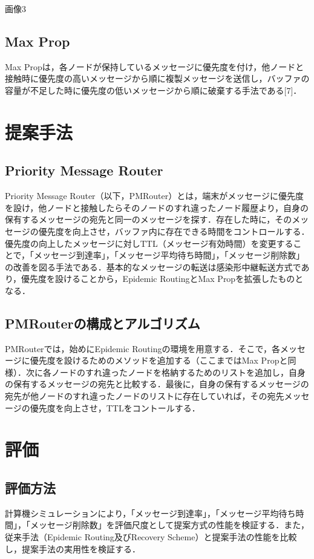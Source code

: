 \documentclass[11pt]{icsthesis}
\begin{document}
画像3

\section{Max Prop}
Max Propは，各ノードが保持しているメッセージに優先度を付け，他ノードと接触時に優先度の高いメッセージから順に複製メッセージを送信し，バッファの容量が不足した時に優先度の低いメッセージから順に破棄する手法である[7]．

\chapter{提案手法}
\section{Priority Message Router}
Priority Message Router（以下，PMRouter）とは，端末がメッセージに優先度を設け，他ノードと接触したらそのノードのすれ違ったノード履歴より，自身の保有するメッセージの宛先と同一のメッセージを探す．存在した時に，そのメッセージの優先度を向上させ，バッファ内に存在できる時間をコントロールする．優先度の向上したメッセージに対しTTL（メッセージ有効時間）を変更することで，「メッセージ到達率」，「メッセージ平均待ち時間」，「メッセージ削除数」の改善を図る手法である．基本的なメッセージの転送は感染形中継転送方式であり，優先度を設けることから，Epidemic RoutingとMax Propを拡張したものとなる．

\section{PMRouterの構成とアルゴリズム}
PMRouterでは，始めにEpidemic Routingの環境を用意する．そこで，各メッセージに優先度を設けるためのメソッドを追加する（ここまではMax Propと同様）．次に各ノードのすれ違ったノードを格納するためのリストを追加し，自身の保有するメッセージの宛先と比較する．最後に，自身の保有するメッセージの宛先が他ノードのすれ違ったノードのリストに存在していれば，その宛先メッセージの優先度を向上させ，TTLをコントールする．

\chapter{評価}
\section{評価方法}
計算機シミュレーションにより，「メッセージ到達率」，「メッセージ平均待ち時間」，「メッセージ削除数」を評価尺度として提案方式の性能を検証する．また，従来手法（Epidemic Routing及びRecovery Scheme）と提案手法の性能を比較し，提案手法の実用性を検証する．
\end{document}
